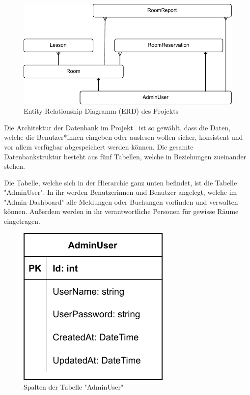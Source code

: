 
\begin{figure}[H]
    \centering
    \includegraphics{media/MariaDB/ERD.svg.pdf}
    \caption{Entity Relationship Diagramm (ERD) des Projekts}
\end{figure}

Die Architektur der Datenbank im Projekt \ZELIA\ ist so gewählt, dass die Daten, welche die Benutzer*innen eingeben oder auslesen wollen sicher, konsistent und vor allem verfügbar abgespeichert werden können. Die gesamte Datenbankstruktur besteht aus fünf Tabellen, welche in Beziehungen zueinander stehen.

\pagebreak


Die Tabelle, welche sich in der Hierarchie ganz unten befindet, ist die Tabelle "AdminUser". In ihr werden Benutzerinnen und Benutzer angelegt, welche im "Admin-Dashboard" alle Meldungen oder Buchungen vorfinden und verwalten können. Außerdem werden in ihr verantwortliche Personen für gewisse Räume eingetragen.

\begin{figure}[H]
    \centering
    \includegraphics{media/MariaDB/AdminUser.svg.pdf}
    \caption{Spalten der Tabelle "AdminUser"}
    \label{fig:AdminUserColls}
\end{figure}

